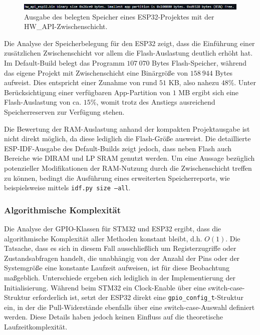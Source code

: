 \begin{figure}[H]
	\includegraphics[width=\textwidth]{Pics/esp32c6_hw_api_debug_size.png}
	\caption{Ausgabe des belegten Speicher eines ESP32-Projektes mit der HW\_API-Zwischenschicht.}
	\label{fig:esp32_hw_api_size}
\end{figure}

Die Analyse der Speicherbelegung für den ESP32 zeigt, dass die Einführung einer zusätzlichen Zwischenschicht vor allem die Flash-Auslastung deutlich erhöht hat. 
Im Default-Build belegt das Programm $107\ 070$ Bytes Flash-Speicher, während das eigene Projekt mit Zwischenschicht eine Binärgröße von $158\ 944$ Bytes aufweist. 
Dies entspricht einer Zunahme von rund $51$ KB, also nahezu $48$\%. Unter Berücksichtigung einer verfügbaren App-Partition von $1$ MB ergibt sich eine Flash-Auslastung von ca. $15$\%, womit trotz des Anstiegs ausreichend Speicherreserven zur Verfügung stehen.

Die Bewertung der RAM-Auslastung anhand der kompakten Projektausgabe ist nicht direkt möglich, da diese lediglich die Flash-Größe ausweist. 
Die detaillierte ESP-IDF-Ausgabe des Default-Builds zeigt jedoch, dass neben Flash auch Bereiche wie DIRAM und LP SRAM genutzt werden. 
Um eine Aussage bezüglich potenzieller Modifikationen der RAM-Nutzung durch die Zwischenschicht treffen zu können, bedingt die Ausführung eines erweiterten Speicherreports, wie beispielsweise mittels \texttt{idf.py size --all}.


\subsubsection{Algorithmische Komplexität}
Die Analyse der GPIO-Klassen für STM32 und ESP32 ergibt, dass die algorithmische Komplexität aller Methoden konstant bleibt, d.h. $O(1)$. 
Die Tatsache, dass es sich in diesem Fall ausschließlich um Registerzugriffe oder Zustandsabfragen handelt, die unabhängig von der Anzahl der Pins oder der Systemgröße eine konstante Laufzeit aufweisen, ist für diese Beobachtung maßgeblich. 
Unterschiede ergeben sich lediglich in der Implementierung der Initialisierung.
Während beim STM32 ein Clock-Enable über eine switch-case-Struktur erforderlich ist, setzt der ESP32 direkt eine \texttt{gpio\_config\_t}-Struktur ein, in der die Pull-Widerstände ebenfalls über eine switch-case-Auswahl definiert werden. 
Diese Details haben jedoch keinen Einfluss auf die theoretische Laufzeitkomplexität.

